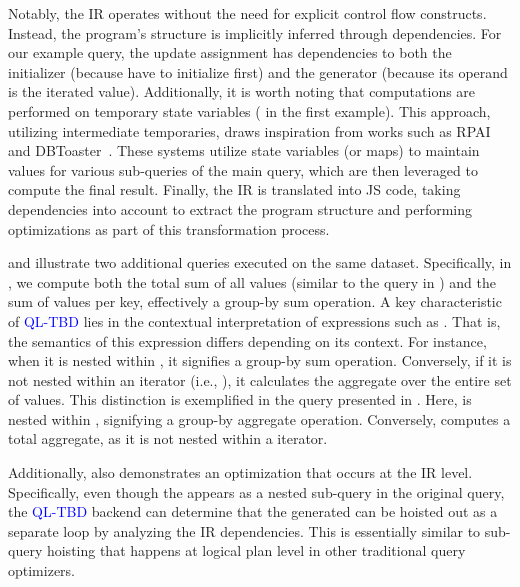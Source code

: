 \documentclass[runningheads]{llncs}
\newcommand{\lang}{\textcolor{blue}{QL-TBD}}
\begin{document}
Notably, the IR operates without the need for explicit control flow constructs.
Instead, the program's structure is implicitly inferred through dependencies.
For our example query, the update assignment  has dependencies to
both the initializer (because have to initialize first) and the generator
(because its operand is the iterated value).
Additionally, it is worth noting that computations are performed on temporary
state variables ( in the first example).
This approach, utilizing intermediate temporaries, draws inspiration from works
such as RPAI~\cite{rpai} and DBToaster~\cite{dbtoaster_vldb}.
These systems utilize state variables (or maps) to maintain values for
various sub-queries of the main query, which are then leveraged to compute the
final result.
Finally, the IR is translated into JS code, taking dependencies into account to
extract the program structure and performing optimizations as part of this
transformation process.

 and  illustrate two additional queries executed on
the same dataset.
Specifically, in , we compute both the total sum of all values
(similar to the query in ) and the sum of values per key, effectively
a group-by sum operation.
A key characteristic of \lang{} lies in the contextual interpretation of expressions
such as .
That is, the semantics of this expression differs depending on its context.
For instance, when it is nested within ,
it signifies a group-by sum operation.
Conversely, if it is not nested within an iterator (i.e., \inline{*}),
it calculates the aggregate over the entire set of values.
This distinction is exemplified in the query presented in .
Here,  is nested within , signifying a
group-by aggregate operation.
Conversely,  computes a total aggregate, as it is not nested
within a  iterator.

Additionally,  also demonstrates an optimization that occurs at the IR level.
Specifically, even though the  appears as a nested sub-query
in the original query, the \lang{} backend can determine that the generated
 can be hoisted out as a separate loop by analyzing the IR dependencies.
This is essentially similar to sub-query hoisting that happens at logical plan level
in other traditional query optimizers.
\end{document}
